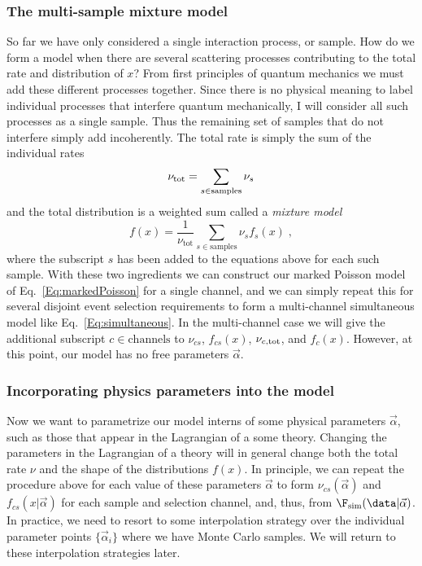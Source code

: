 \subsubsection{The multi-sample mixture model}
So far we have only considered a single interaction process, or sample.  How do we form a model when there are several scattering processes contributing to the total rate and distribution of $x$?  From first principles of quantum mechanics we must add these different processes together.  Since there is no physical meaning to label individual processes that interfere quantum mechanically, I will consider all such processes as a single sample.  Thus the remaining set of samples that do not interfere simply add incoherently.  The total rate is simply the sum of the individual rates
\begin{equation}
\nu_{\rm tot} = \sum_{s\in\textrm{samples}} \nu_s
\end{equation}
and the total distribution is a weighted sum called a \textit{mixture model}
\begin{equation}
f(x) = \frac{1}{\nu_{\textrm{tot}}} \sum_{s\in\textrm{samples}} \nu_s f_s(x)\;,
\end{equation}
where the subscript $s$ has been added to the equations above for each such sample.  With these two ingredients we can construct our  marked Poisson model of Eq.~\ref{Eq:markedPoisson} for a single channel, and we can simply repeat this for several disjoint event selection requirements to form a multi-channel simultaneous model like Eq.~\ref{Eq:simultaneous}.  In the multi-channel case we will give the additional subscript $c\in\textrm{channels}$ to $\nu_{cs}$, $f_{cs}(x)$, $\nu_{c,\rm{tot}}$, and $f_c(x)$. However, at this point, our model has no free parameters $\vec\alpha$.


\subsubsection{Incorporating physics parameters into the model}


Now we want to parametrize our model interns of some physical parameters $\vec\alpha$, such as those that appear in the Lagrangian of a some theory.  Changing the parameters in the Lagrangian of a theory will in general change both the total rate $\nu$ and the shape of the distributions $f(x)$.  In principle, we can repeat the procedure above for each value of these parameters $\vec\alpha$ to form $\nu_{cs}(\vec\alpha)$ and $f_{cs}(x|\vec\alpha)$ for each sample and selection channel, and, thus, from $\F_\textrm{sim}(\data|\vec\alpha)$.  In practice, we need to resort to some interpolation strategy over the individual parameter points $\{\vec\alpha_i\}$ where we have Monte Carlo samples.  We will return to these interpolation strategies later.


